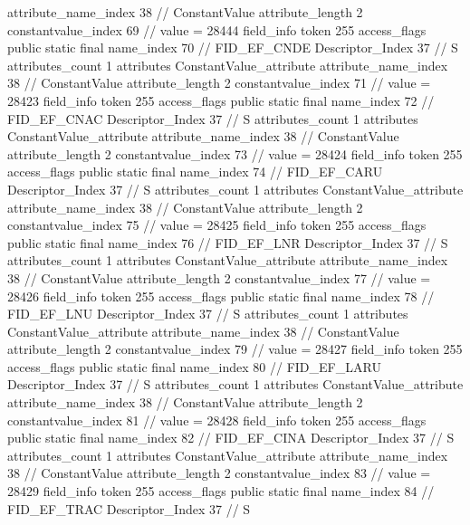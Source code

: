 {{{{{{{					attribute_name_index	38		// ConstantValue
					attribute_length	2
					constantvalue_index	69		// value = 28444
				}
				}
			}
			field_info {
				token	255
				access_flags	public static final
				name_index	70		// FID_EF_CNDE
				Descriptor_Index	37		// S
				attributes_count	1
				attributes {
				ConstantValue_attribute {
					attribute_name_index	38		// ConstantValue
					attribute_length	2
					constantvalue_index	71		// value = 28423
				}
				}
			}
			field_info {
				token	255
				access_flags	public static final
				name_index	72		// FID_EF_CNAC
				Descriptor_Index	37		// S
				attributes_count	1
				attributes {
				ConstantValue_attribute {
					attribute_name_index	38		// ConstantValue
					attribute_length	2
					constantvalue_index	73		// value = 28424
				}
				}
			}
			field_info {
				token	255
				access_flags	public static final
				name_index	74		// FID_EF_CARU
				Descriptor_Index	37		// S
				attributes_count	1
				attributes {
				ConstantValue_attribute {
					attribute_name_index	38		// ConstantValue
					attribute_length	2
					constantvalue_index	75		// value = 28425
				}
				}
			}
			field_info {
				token	255
				access_flags	public static final
				name_index	76		// FID_EF_LNR
				Descriptor_Index	37		// S
				attributes_count	1
				attributes {
				ConstantValue_attribute {
					attribute_name_index	38		// ConstantValue
					attribute_length	2
					constantvalue_index	77		// value = 28426
				}
				}
			}
			field_info {
				token	255
				access_flags	public static final
				name_index	78		// FID_EF_LNU
				Descriptor_Index	37		// S
				attributes_count	1
				attributes {
				ConstantValue_attribute {
					attribute_name_index	38		// ConstantValue
					attribute_length	2
					constantvalue_index	79		// value = 28427
				}
				}
			}
			field_info {
				token	255
				access_flags	public static final
				name_index	80		// FID_EF_LARU
				Descriptor_Index	37		// S
				attributes_count	1
				attributes {
				ConstantValue_attribute {
					attribute_name_index	38		// ConstantValue
					attribute_length	2
					constantvalue_index	81		// value = 28428
				}
				}
			}
			field_info {
				token	255
				access_flags	public static final
				name_index	82		// FID_EF_CINA
				Descriptor_Index	37		// S
				attributes_count	1
				attributes {
				ConstantValue_attribute {
					attribute_name_index	38		// ConstantValue
					attribute_length	2
					constantvalue_index	83		// value = 28429
				}
				}
			}
			field_info {
				token	255
				access_flags	public static final
				name_index	84		// FID_EF_TRAC
				Descriptor_Index	37		// S
}}}}}
